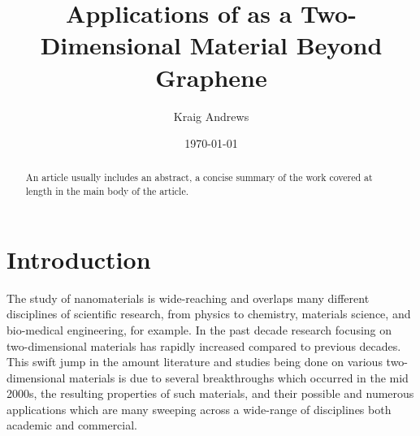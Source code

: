 \documentclass[%
 reprint,
 amsmath,amssymb,
 aps,
pra,
]{revtex4-1}
\begin{document}

\title{Applications of \mos as a Two-Dimensional Material Beyond Graphene}%

\author{Kraig Andrews}%
%




\date{\today}%

\begin{abstract}
An article usually includes an abstract, a concise summary of the work
covered at length in the main body of the article. 
\end{abstract}

\maketitle


\section{\label{sec:introduction} Introduction}
The study of nanomaterials is wide-reaching and overlaps many different disciplines of scientific research, from physics to chemistry, materials science, and bio-medical engineering, for example. In the past decade research focusing on two-dimensional materials has rapidly increased compared to previous decades. This swift jump in the amount literature and studies being done on various two-dimensional materials is due to several breakthroughs which occurred in the mid 2000s, the resulting properties of such materials, and their possible and numerous applications which are many sweeping across a wide-range of disciplines both academic and commercial. 
\end{document}
